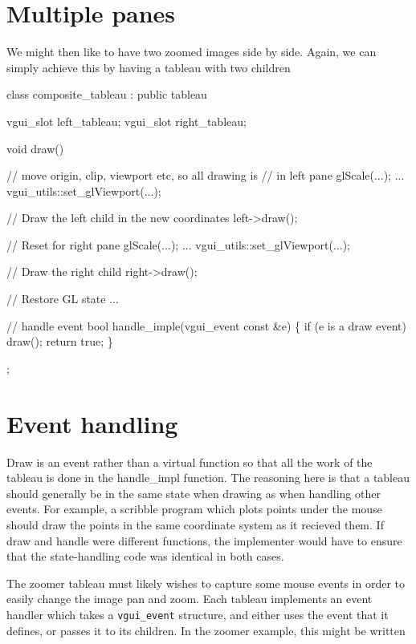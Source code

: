 \documentclass[12pt]{report} \usepackage{epsfig}
\begin{document}
\section{Multiple panes}

We might then like to have two zoomed images side by side.  Again, we can
simply achieve this by having a tableau with two children

{\scriptsize \begin{verbawf}
  class composite\_tableau : public tableau {
    vgui_slot left_tableau;
    vgui_slot right_tableau;

    void draw() {
      //  move origin, clip, viewport etc, so all drawing is
      //  in left pane
      glScale(...);
      ...
      vgui_utils::set_glViewport(...);

      //  Draw the left child in the new coordinates
      left->draw();

      //  Reset for right pane
      glScale(...);
      ...
      vgui_utils::set_glViewport(...);

      //  Draw the right child
      right->draw();

      //  Restore GL state
      ...
    }

    // handle event
    bool handle_imple(vgui_event const &e)
    \{
      if (e is a draw event)
        draw();
      return true;
    \}
  };
\end{verbawf}}

\section{Event handling}

Draw is an event rather than a virtual function so that
all the work of the tableau is done in the handle\_impl function.
The reasoning here is that a tableau should generally be in the same
state when drawing as when handling other events.  For example, a scribble
program which plots points under the mouse should draw the points in
the same coordinate system as it recieved them.   If draw and handle
were different functions, the implementer would have to ensure that
the state-handling code was identical in both cases.

The zoomer tableau must likely wishes to capture some mouse events in order
to easily change the image pan and zoom.  Each tableau implements an event
handler which takes a {\tt vgui\_event} structure, and either uses
the event that it defines, or passes it to its children.  In the zoomer
example, this might be written
\end{document}
